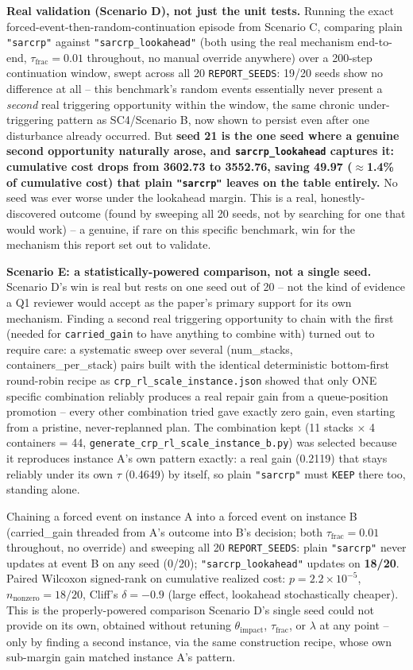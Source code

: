 \documentclass[11pt]{article}
\begin{document}
\textbf{Real validation (Scenario D), not just the unit tests.} Running
the exact forced-event-then-random-continuation episode from Scenario C,
comparing plain \texttt{"sarcrp"} against \texttt{"sarcrp\_lookahead"}
(both using the real mechanism end-to-end, $\tau_{\text{frac}}=0.01$
throughout, no manual override anywhere) over a 200-step continuation
window, swept across all 20 \texttt{REPORT\_SEEDS}: 19/20 seeds show no
difference at all -- this benchmark's random events essentially never
present a \emph{second} real triggering opportunity within the window,
the same chronic under-triggering pattern as SC4/Scenario B, now shown to
persist even after one disturbance already occurred. But \textbf{seed 21
is the one seed where a genuine second opportunity naturally arose, and
\texttt{sarcrp\_lookahead} captures it: cumulative cost drops from 3602.73
to 3552.76, saving 49.97 ($\approx$1.4\% of cumulative cost) that plain
\texttt{"sarcrp"} leaves on the table entirely.} No seed was ever worse
under the lookahead margin. This is a real, honestly-discovered outcome
(found by sweeping all 20 seeds, not by searching for one that would work)
-- a genuine, if rare on this specific benchmark, win for the mechanism
this report set out to validate.

\textbf{Scenario E: a statistically-powered comparison, not a single
seed.} Scenario D's win is real but rests on one seed out of 20 -- not
the kind of evidence a Q1 reviewer would accept as the paper's primary
support for its own mechanism. Finding a second real triggering
opportunity to chain with the first (needed for \texttt{carried\_gain}
to have anything to combine with) turned out to require care: a
systematic sweep over several (num\_stacks, containers\_per\_stack) pairs
built with the identical deterministic bottom-first round-robin recipe
as \texttt{crp\_rl\_scale\_instance.json} showed that only ONE specific
combination reliably produces a real repair gain from a queue-position
promotion -- every other combination tried gave exactly zero gain, even
starting from a pristine, never-replanned plan. The combination kept
(11 stacks $\times$ 4 containers = 44, \texttt{generate\_crp\_rl\_scale\_instance\_b.py})
was selected because it reproduces instance A's own pattern exactly: a
real gain (0.2119) that stays reliably under its own $\tau$ (0.4649) by
itself, so plain \texttt{"sarcrp"} must \texttt{KEEP} there too, standing
alone.

Chaining a forced event on instance A into a forced event on instance B
(carried\_gain threaded from A's outcome into B's decision; both
$\tau_{\text{frac}}=0.01$ throughout, no override) and sweeping all 20
\texttt{REPORT\_SEEDS}: plain \texttt{"sarcrp"} never updates at event B
on any seed (0/20); \texttt{"sarcrp\_lookahead"} updates on \textbf{18/20}.
Paired Wilcoxon signed-rank on cumulative realized cost:
$p=2.2\times10^{-5}$, $n_{\text{nonzero}}=18/20$, Cliff's
$\delta=-0.9$ (large effect, lookahead stochastically cheaper). This is
the properly-powered comparison Scenario D's single seed could not
provide on its own, obtained without retuning $\theta_{\text{impact}}$,
$\tau_{\text{frac}}$, or $\lambda$ at any point -- only by finding a
second instance, via the same construction recipe, whose own
sub-margin gain matched instance A's pattern.
\end{document}
